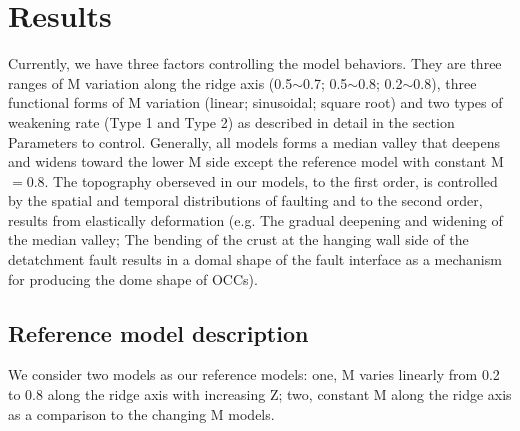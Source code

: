 \pagebreak
\section{Results}
Currently, we have three factors controlling the model behaviors. They are three ranges of M variation along the ridge axis (0.5$\sim$0.7; 0.5$\sim$0.8; 0.2$\sim$0.8), three functional forms of M variation (linear; sinusoidal; square root) and two types of weakening rate (Type 1 and Type 2) as described in detail in the section Parameters to control. Generally, all models forms a median valley that deepens and widens toward the lower M side except the reference model with constant M$=0.8$. The topography oberseved in our models, to the first order, is controlled by the spatial and temporal distributions of faulting and to the second order, results from elastically deformation (e.g. The gradual deepening and widening of the median valley; The bending of the crust at the hanging wall side of the detatchment fault results in a domal shape of the fault interface as a mechanism for producing the dome shape of OCCs).      

\subsection{Reference model description}
We consider two models as our reference models: one, M varies linearly from 0.2 to 0.8 along the ridge axis with increasing Z; two, constant M along the ridge axis as a comparison to the changing M models.

